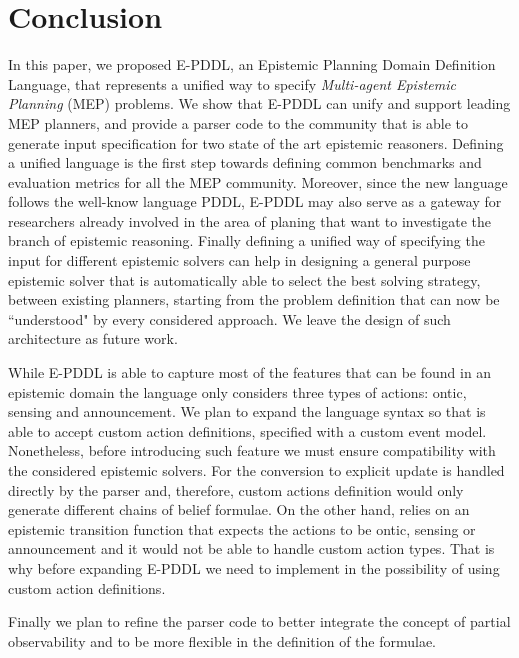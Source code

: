 \section{Conclusion}

In this paper, we proposed E-PDDL, an Epistemic Planning Domain Definition Language, that represents a unified way to specify \emph{Multi-agent Epistemic Planning} (MEP) problems.
We show that E-PDDL can unify and support leading MEP planners, and provide a parser code to the community that is able to generate input specification for two state of the art epistemic reasoners.
Defining a unified language is the first step towards defining common benchmarks and evaluation metrics for all the MEP community.
Moreover, since the new language follows the well-know language PDDL, E-PDDL may also serve as a gateway for researchers already involved in the area of planing that want to investigate the branch of epistemic reasoning.
Finally defining a unified way of specifying the input for different epistemic solvers can help in designing a general purpose epistemic solver that is automatically able to select the best solving strategy, between existing planners, starting from the problem definition that can now be  ``understood" by every considered approach.
We leave the design of such architecture as future work.

While E-PDDL is able to capture most of the features that can be found in an epistemic domain the language only considers three types of actions: ontic, sensing and announcement.
We plan to expand the language syntax so that is able to accept custom action definitions, specified with a custom event model.
Nonetheless, before introducing such feature we must ensure compatibility with the considered epistemic solvers.
For \rpmep the conversion to explicit \knobel update is handled directly by the parser and, therefore, custom actions definition would only generate different chains of belief formulae.
On the other hand, \EFP relies on an epistemic transition function that expects the actions to be ontic, sensing or announcement and it would not be able to handle custom action types.
That is why before expanding E-PDDL we need to implement in \EFP the possibility of using custom action definitions. 

Finally we plan to refine the parser code to better integrate the concept of partial observability and to be more flexible in the definition of the formulae.
